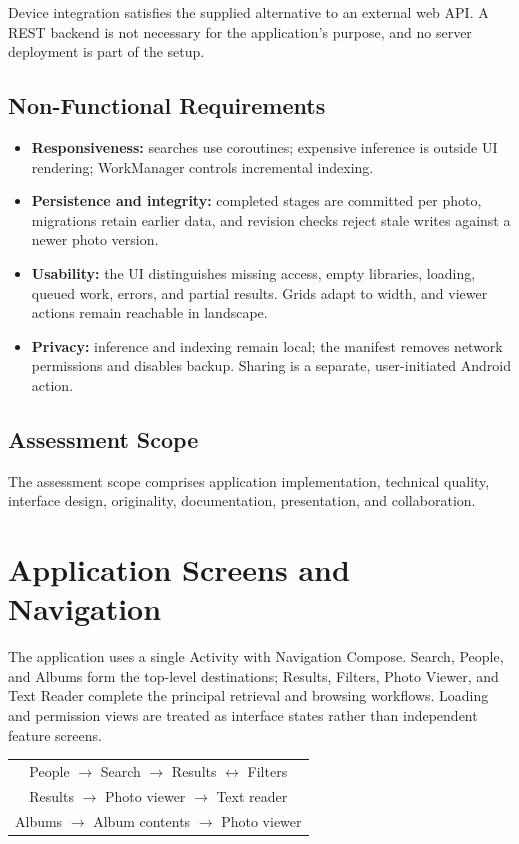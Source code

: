 \documentclass[11pt,a4paper]{article}
\newcommand{\reportsection}[1]{\section{#1}}
\begin{document}
Device integration satisfies the supplied alternative to an external web API. A REST backend is not necessary for the application's purpose, and no server deployment is part of the setup.

\subsection{Non-Functional Requirements}

\begin{itemize}
\item \textbf{Responsiveness:} searches use coroutines; expensive inference is outside UI rendering; WorkManager controls incremental indexing.
\item \textbf{Persistence and integrity:} completed stages are committed per photo, migrations retain earlier data, and revision checks reject stale writes against a newer photo version.
\item \textbf{Usability:} the UI distinguishes missing access, empty libraries, loading, queued work, errors, and partial results. Grids adapt to width, and viewer actions remain reachable in landscape.
\item \textbf{Privacy:} inference and indexing remain local; the manifest removes network permissions and disables backup. Sharing is a separate, user-initiated Android action.
\end{itemize}

\subsection{Assessment Scope}

The assessment scope comprises application implementation, technical quality, interface design, originality, documentation, presentation, and collaboration. 

\reportsection{Application Screens and Navigation}
\label{sec:screens}

The application uses a single Activity with Navigation Compose. Search, People, and Albums form the top-level destinations; Results, Filters, Photo Viewer, and Text Reader complete the principal retrieval and browsing workflows. Loading and permission views are treated as interface states rather than independent feature screens.


\begin{center}
\begin{tabular}{c}
People $\rightarrow$ Search $\rightarrow$ Results $\leftrightarrow$ Filters \\[5pt]
Results $\rightarrow$ Photo viewer $\rightarrow$ Text reader \\[5pt]
Albums $\rightarrow$ Album contents $\rightarrow$ Photo viewer
\end{tabular}
\end{center}
\end{document}
